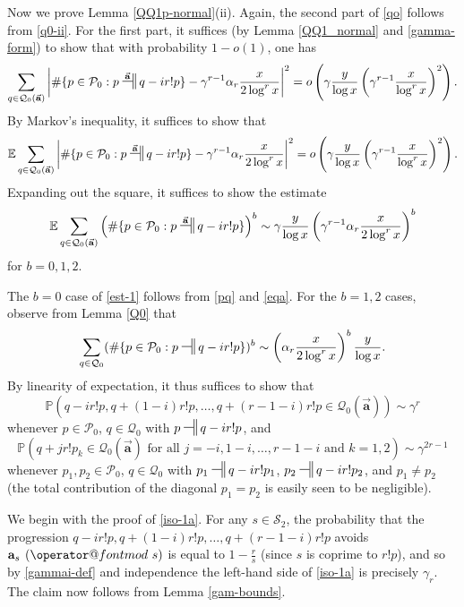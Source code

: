 \documentclass[12pt]{amsart}
\makeatletter
\numberwithin{equation}{section}  %
\theoremstyle{remark}
\theoremstyle{plain}
\numberwithin{equation}{section}
\newcommand{\E}{\mathbb{E}}  %
\newcommand{\PR}{\mathbb{P}}  %
\renewcommand{\pmod}[1]{\allowbreak\mkern7mu({\operator@font mod}\,\,#1)}
\renewcommand{\(}{\left(}
\renewcommand{\)}{\right)}
\newcommand{\asym}{\sim}   %
\newcommand{\relr}{\nsdtstile{}{}} %
\newcommand{\relra}{\nsdtstile{}{\vect{\mathbf{a}}}} %
\newcommand{\vect}[1]{{\ensuremath{\vec{#1}}}}
\newcommand{\PP}{\mathcal{P}}
\newcommand{\QQ}{\mathcal{Q}}
\newcommand{\cS}{\mathcal{S}}
\makeatother
\begin{document}
Now we prove Lemma \ref{QQ1p-normal}(ii).  Again, the second part of
\eqref{qo} follows from \eqref{q0-ii}.  For the first part, it
suffices (by Lemma \ref{QQ1_normal} and \eqref{gamma-form}) to show that with probability $1-o(1)$, one has
$$ \sum_{q \in \QQ_0(\vect{\mathbf{a}})} \left|\# \{ p \in \PP_0: p \relra q - ir! p \} - \gamma^{r-1} \alpha_r \frac{x}{2\log^r x}\right|^2 = o\left( \gamma \frac{y}{\log x} \(\gamma^{r-1} \frac{x}{\log^r x}\)^2 \right).$$
By Markov's inequality, it suffices to show that
$$ \E \sum_{q \in \QQ_0(\vect{\mathbf{a}})} \left|\# \{ p \in \PP_0: p \relra q - ir! p \} - \gamma^{r-1} \alpha_r \frac{x}{2\log^r x}\right|^2 = o\left( \gamma \frac{y}{\log x} \(\gamma^{r-1} \frac{x}{\log^r x}\)^2 \right).$$
Expanding out the square, it suffices to show the estimate
\begin{equation}\label{est-1}
\E \sum_{q \in \QQ_0(\vect{\mathbf{a}})} \(\# \{ p \in \PP_0: p \relra
q - ir! p \}\)^b  \asym  \gamma \frac{y}{\log x} \(\gamma^{r-1} \alpha_r
\frac{x}{2\log^r x}\)^b
\end{equation}
for $b=0,1,2$.

The $b=0$ case of \eqref{est-1} follows from \eqref{pq} and \eqref{eqa}.  For the $b=1,2$ cases, observe from Lemma \ref{Q0} that
$$
\sum_{q \in \QQ_0} (\# \{ p \in \PP_0: p \relr q - ir! p \})^b \asym \left(\alpha_r \frac{x}{2\log^r x}\right)^b \frac{y}{\log x}.
$$
By linearity of expectation, it thus suffices to show that
\begin{equation}\label{iso-1a}
\PR( q-ir!p, q+(1-i)r!p,\dots, q+(r-1-i)r! p \in \QQ_0(\vect{\mathbf{a}}) ) \asym \gamma^r
\end{equation}
whenever $p \in \PP_0$, $q \in \QQ_0$ with $p \relr q-ir! p$, and
\begin{equation}\label{iso-2a}
\PR( q+jr!p_k \in \QQ_0(\vect{\mathbf{a}}) \mbox{ for all }
j=-i,1-i,\ldots,r-1-i \mbox{ and } k=1,2 ) \asym \gamma^{2r-1}
\end{equation}
whenever $p_1, p_2 \in \PP_0$, $q \in \QQ_0$ with $p_1 \relr q-ir!
p_1$, $p_2 \relr q-ir! p_2$, and $p_1 \neq p_2$ (the total
contribution of the diagonal $p_1=p_2$ is easily seen to be
negligible). 

We begin with the proof of \eqref{iso-1a}.  For any $s \in \cS_2$, the probability that the progression $q-ir!p, q+(1-i)r!p,\dots, q+(r-1-i)r! p$ avoids $\mathbf{a}_s \pmod{s}$ is equal to $1-\frac{r}{s}$ (since $s$ is coprime to $r!p$), and so by \eqref{gammai-def} and independence the left-hand side of \eqref{iso-1a} is precisely $\gamma_r$.  The claim now follows from Lemma \ref{gam-bounds}.
\end{document}
